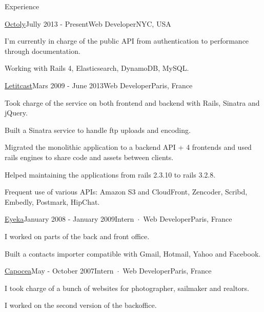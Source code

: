 \documentclass{resume} %
\begin{document}

\begin{rSection}{Experience}

\begin{rSubsection}{\href{http://octoly.com}{Octoly}}{Jully 2013 - Present}{Web Developer}{NYC, USA}
\item I'm currently in charge of the public API from authentication to performance through documentation.
\item Working with Rails 4, Elasticsearch, DynamoDB, MySQL.
\end{rSubsection}


\begin{rSubsection}{\href{http://letitcast.com}{Letitcast}}{Mars 2009 - June 2013}{Web Developer}{Paris, France}
\item Took charge of the service on both frontend and backend with Rails, Sinatra and jQuery.
\item Built a Sinatra service to handle ftp uploads and encoding.
\item Migrated the monolithic application to a backend API + 4 frontends and used rails engines to share code and assets between clients.
\item Helped maintaining the applications from rails 2.3.10 to rails 3.2.8.
\item Frequent use of various APIs: Amazon S3 and CloudFront, Zencoder, Scribd, Embedly, Postmark, HipChat.
\end{rSubsection}


\begin{rSubsection}{\href{http://eyeka.com}{Eyeka}}{January 2008 - January 2009}{Intern~$\cdot$~Web Developer}{Paris, France}
\item I worked on parts of the back and front office.
\item Built a contacts importer compatible with Gmail, Hotmail, Yahoo and Facebook.
\end{rSubsection}

\begin{rSubsection}{\href{http://capocea.com}{Capocea}}{May - October 2007}{Intern~$\cdot$~Web Developer}{Paris, France}
\item I took charge of a bunch of websites for photographer, sailmaker and realtors.
\item I worked on the second version of the backoffice.
\end{rSubsection}


\end{rSection}
\end{document}
